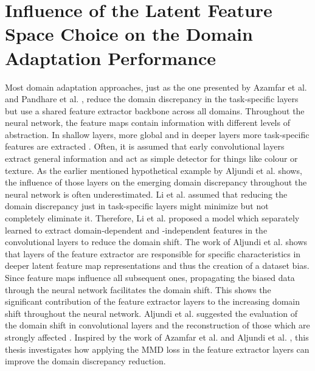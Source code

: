 \section{Influence of the Latent Feature Space Choice on the Domain Adaptation Performance}
Most domain adaptation approaches, just as the one presented by Azamfar et al. \cite{AZAMFAR2020103932} and Pandhare et al. \cite{Pandhare2021}, reduce the domain discrepancy in the task-specific layers but use a shared feature extractor backbone across all domains. Throughout the neural network, the feature maps contain information with different levels of abstraction. In shallow layers, more global and in deeper layers more task-specific features are extracted \cite{Aljundi2016}. Often, it is assumed that early convolutional layers extract general information and act as simple detector for things like colour or texture. As the earlier mentioned hypothetical example by Aljundi et al. \cite{Aljundi2016} shows, the influence of those layers on the emerging domain discrepancy throughout the neural network is often underestimated. Li et al. \cite{li2020} assumed that reducing the domain discrepancy just in task-specific layers might minimize but not completely eliminate it. Therefore, Li et al. \cite{li2020} proposed a model which separately learned to extract domain-dependent and -independent features in the convolutional layers to reduce the domain shift. The work of Aljundi et al. \cite{Aljundi2016} shows that layers of the feature extractor are responsible for specific characteristics in deeper latent feature map representations and thus the creation of a dataset bias. Since feature maps influence all subsequent ones, propagating the biased data through the neural network facilitates the domain shift. This shows the significant contribution of the feature extractor layers to the increasing domain shift throughout the neural network. Aljundi et al. \cite{Aljundi2016} suggested the evaluation of the domain shift in convolutional layers and the reconstruction of those which are strongly affected \cite{Aljundi2016}. Inspired by the work of Azamfar et al. \cite{Aljundi2016} and Aljundi et al. \cite{Aljundi2016}, this thesis investigates how applying the MMD loss in the feature extractor layers can improve the domain discrepancy reduction.

